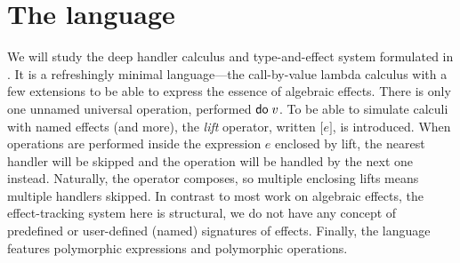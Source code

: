 \documentclass[a4paper, 12pt]{report}
\newcommand{\Do}{\textsf{do\;}}
\newcommand{\Lift}[1]{\boldsymbol{[}#1\boldsymbol{]}}
\newcommand{\+}{\enspace}
\begin{document}
\iffalse
This work will study a particular formal language equipped with algebraic effects.
Although most results in the domain of programming languages depend crucially on the exact calculus and type system used,
we hope that the results, ideas, and techniques may apply elsewhere.
This should not seem far-fetched,
as the paper which introduced the language \cite{fscd19} is exactly about
interexpressibility with other systems.

Possibly the most interesting result of this work is a potentially novel use of coinduction
in the method of logical relations.
It allowed us to get rid of step-indexing in the definition of the logical relation and
ultimately prove termination of the language.
This may sound surprising, as coinduction is connotated primarily with infinite processes.

[todo other contributions]

I would like to thank Dariusz Biernacki, Filip Sieczkowski, and Piotr Polesiuk
for their help with this work.
\fi

\chapter{The language}

We will study the deep handler calculus and type-and-effect system formulated
in \cite{fscd19}.
It is a refreshingly minimal language---the call-by-value lambda calculus with a few extensions
to be able to express the essence of algebraic effects.
There is only one unnamed universal operation, performed $\Do v$.
To be able to simulate calculi with named effects (and more),
the \textit{lift} operator, written $\Lift{e}$, is introduced.
When operations are performed inside the expression $e$ enclosed by lift,
the nearest handler will be skipped and the operation will be handled by the next one instead.
Naturally, the operator composes, so multiple enclosing lifts means multiple handlers skipped.
In contrast to most work on algebraic effects, the effect-tracking system here is structural,
we do not have any concept of predefined or user-defined (named) signatures of effects.
Finally, the language features polymorphic expressions and polymorphic operations.
\end{document}
